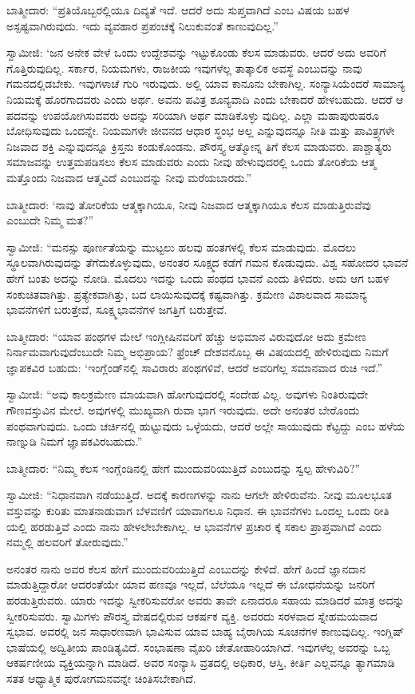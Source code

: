 ಬಾತ್ಮೀದಾರ: “ಪ್ರತಿಯೊಬ್ಬರಲ್ಲಿಯೂ ದಿವ್ಯತೆ ಇದೆ. ಆದರೆ ಅದು ಸುಪ್ತವಾಗಿದೆ ಎಂಬ ವಿಷಯ ಬಹಳ ಅಸ್ಪಷ್ಟವಾಗಿರುವುದು. ಇದು ವ್ಯವಹಾರ ಪ್ರಪಂಚಕ್ಕೆ ನಿಲುಕುವಂತೆ ಕಾಣುವುದಿಲ್ಲ.”

ಸ್ವಾಮೀಜಿ: ‘ಜನ ಅನೇಕ ವೇಳೆ ಒಂದು ಉದ್ದೇಶವನ್ನು ಇಟ್ಟುಕೊಂಡು ಕೆಲಸ ಮಾಡುವರು. ಆದರೆ ಅದು ಅವರಿಗೆ ಗೊತ್ತಿರುವುದಿಲ್ಲ. ಸರ್ಕಾರ, ನಿಯಮಗಳು, ರಾಜಕೀಯ ಇವುಗಳೆಲ್ಲ ತಾತ್ಕಾಲಿಕ ಅವಸ್ಥೆ ಎಂಬುದನ್ನು ನಾವು ಗಮನದಲ್ಲಿಡಬೇಕು. ಇವುಗಳಾಚೆ ಗುರಿ ಇರುವುದು. ಅಲ್ಲಿ ಯಾವ ಕಾನೂನು ಬೇಕಾಗಿಲ್ಲ. ಸಂನ್ಯಾಸಿಯೆಂದರೆ ಸಾಮಾನ್ಯ ನಿಯಮಕ್ಕೆ ಹೊರಗಾದವರು ಎಂದು ಅರ್ಥ. ಅವನು ಪವಿತ್ರ ಶೂನ್ಯವಾದಿ ಎಂದು ಬೇಕಾದರೆ ಹೇಳಬಹುದು. ಆದರೆ ಆ ಪದವನ್ನು ಉಪಯೋಗಿಸುವವರು ಅದನ್ನು ಸರಿಯಾಗಿ ಅರ್ಥ ಮಾಡಿಕೊಳ್ಳು ವುದಿಲ್ಲ. ಎಲ್ಲಾ ಮಹಾಪುರುಷರೂ ಬೋಧಿಸುವುದು ಒಂದನ್ನೇ. ನಿಯಮಗಳೇ ಜೀವನದ ಆಧಾರ ಸ್ಥಂಭ ಅಲ್ಲ ಎನ್ನುವುದನ್ನೂ ನೀತಿ ಮತ್ತು ಪಾವಿತ್ರ್ಯಗಳೇ ನಿಜವಾದ ಶಕ್ತಿ ಎನ್ನುವುದನ್ನೂ ಕ್ರಿಸ್ತನು ಕಂಡುಕೊಂಡನು. ಪೌರಸ್ತ್ಯ ಆತ್ಮೋನ್ನ ತಿಗೆ ಕೆಲಸ ಮಾಡುವರು. ಪಾಶ್ಚಾತ್ಯರು ಸಮಾಜವನ್ನು ಉತ್ತಮಪಡಿಸಲು ಕೆಲಸ ಮಾಡುವರು ಎಂದು ನೀವು ಹೇಳುವುದರಲ್ಲಿ ಒಂದು ತೋರಿಕೆಯ ಆತ್ಮ ಮತ್ತೊಂದು ನಿಜವಾದ ಆತ್ಮವಿದೆ ಎಂಬುದನ್ನು ನೀವು ಮರೆಯಬಾರದು.”

ಬಾತ್ಮೀದಾರ: ‘ನಾವು ತೋರಿಕೆಯ ಆತ್ಮಕ್ಕಾಗಿಯೂ, ನೀವು ನಿಜವಾದ ಆತ್ಮಕ್ಕಾಗಿಯೂ ಕೆಲಸ ಮಾಡುತ್ತಿರುವೆವು ಎಂಬುದೇ ನಿಮ್ಮ ಮತ?”

ಸ್ವಾಮೀಜಿ: “ಮನಸ್ಸು ಪೂರ್ಣತೆಯನ್ನು ಮುಟ್ಟಲು ಹಲವು ಹಂತಗಳಲ್ಲಿ ಕೆಲಸ ಮಾಡುವುದು. ಮೊದಲು ಸ್ಥೂಲವಾಗಿರುವುದನ್ನು ತೆಗೆದುಕೊಳ್ಳುವುದು, ಅನಂತರ ಸೂಕ್ಷ್ಮದ ಕಡೆಗೆ ಗಮನ ಕೊಡುವುದು. ವಿಶ್ವ ಸಹೋದರ ಭಾವನೆ ಹೇಗೆ ಬಂತು ಅದನ್ನು ನೋಡಿ. ಮೊದಲು ಇದನ್ನು ಒಂದು ಪಂಥದ ಭಾವನೆ ಎಂದು ತಿಳಿದರು. ಅದು ಆಗ ಬಹಳ ಸಂಕುಚಿತವಾಗಿತ್ತು. ಪ್ರತ್ಯೇಕವಾಗಿತ್ತು, ಬದ ಲಾಯಿಸುವುದಕ್ಕೆ ಕಷ್ಟವಾಗಿತ್ತು. ಕ್ರಮೇಣ ವಿಶಾಲವಾದ ಸಾಮಾನ್ಯ ಭಾವನೆಗಳಿಗೆ ಬರುತ್ತೇವೆ, ಸೂಕ್ಷ್ಮಭಾವನೆಗಳ ಜಗತ್ತಿಗೆ ಬರುತ್ತೇವೆ.

ಬಾತ್ಮೀದಾರ: “ಯಾವ ಪಂಥಗಳ ಮೇಲೆ ಇಂಗ್ಲೀಷಿನವರಿಗೆ ಹೆಚ್ಚು ಅಭಿಮಾನ ವಿರುವುದೋ ಅದು ಕ್ರಮೇಣ ನಿರ್ನಾಮವಾಗುವುದೆಂಬುದೇ ನಿಮ್ಮ ಅಭಿಪ್ರಾಯ? ಫ್ರೆಂಚ್​ ದೇಶವನೊಬ್ಬ ಈ ವಿಷಯದಲ್ಲಿ ಹೇಳಿರುವುದು ನಿಮಗೆ ಜ್ಞಾಪಕವಿರ ಬಹುದು: ‘ಇಂಗ್ಲೆಂಡ್​ನಲ್ಲಿ ಸಾವಿರಾರು ಪಂಥಗಳಿವೆ, ಆದರೆ ಅವರಿಗೆಲ್ಲ ಸಮಾನವಾದ ರುಚಿ ಇದೆ.”

ಸ್ವಾಮೀಜಿ: “ಅವು ಕಾಲಕ್ರಮೇಣ ಮಾಯವಾಗಿ ಹೋಗುವುದರಲ್ಲಿ ಸಂದೇಹ ವಿಲ್ಲ. ಅವುಗಳು ನಿಂತಿರುವುದೇ ಗೌಣವಸ್ತುವಿನ ಮೇಲೆ. ಅವುಗಳಲ್ಲಿ ಮುಖ್ಯವಾಗಿ ರುವಾ ಭಾಗ ಇರುವುದು. ಅದೇ ಅನಂತರ ಬೇರೊಂದು ಪಂಥವಾಗುವುದು. ಒಂದು ಚರ್ಚಿನಲ್ಲಿ ಹುಟ್ಟುವುದು ಒಳ್ಳೆಯದು, ಆದರೆ ಅಲ್ಲೇ ಸಾಯುವುದು ಕೆಟ್ಟದ್ದು ಎಂಬ ಹಳೆಯ ನಾಣ್ನುಡಿ ನಿಮಗೆ ಜ್ಞಾಪಕವಿರಬಹುದು.”

ಬಾತ್ಮೀದಾರ: “ನಿಮ್ಮ ಕೆಲಸ ಇಂಗ್ಲೆಂಡಿನಲ್ಲಿ ಹೇಗೆ ಮುಂದುವರಿಯುತ್ತಿದೆ ಎಂಬುದನ್ನು ಸ್ವಲ್ಪ ಹೇಳುವಿರಿ?”

ಸ್ವಾಮೀಜಿ: “ನಿಧಾನವಾಗಿ ನಡೆಯುತ್ತಿದೆ. ಅದಕ್ಕೆ ಕಾರಣಗಳನ್ನು ನಾನು ಆಗಲೇ ಹೇಳಿರುವೆನು. ನೀವು ಮೂಲಭೂತ ವಸ್ತುವನ್ನು ಕುರಿತು ಮಾತನಾಡುವಾಗ ಬೆಳವಣಿಗೆ ಯಾವಾಗಲೂ ನಿಧಾನ. ಈ ಭಾವನೆಗಳು ಒಂದಲ್ಲ ಒಂದು ರೀತಿ ಯಲ್ಲಿ ಹರಡುತ್ತಿವೆ ಎಂದು ನಾನು ಹೇಳಲೇಬೇಕಾಗಿಲ್ಲ. ಆ ಭಾವನೆಗಳ ಪ್ರಚಾರ ಕ್ಕೆ ಸಕಾಲ ಪ್ರಾಪ್ತವಾಗಿದೆ ಎಂದು ನಮ್ಮಲ್ಲಿ ಹಲವರಿಗೆ ತೋರುವುದು.”

ಅನಂತರ ನಾನು ಅವರ ಕೆಲಸ ಹೇಗೆ ಮುಂದುವರಿಯುತ್ತಿದೆ ಎಂಬುದನ್ನು ಕೇಳಿದೆ. ಹೇಗೆ ಹಿಂದೆ ಜ್ಞಾನದಾನ ಮಾಡುತ್ತಿದ್ದಾರೋ ಆದರಂತೆಯೇ ಯಾವ ಹಣವೂ ಇಲ್ಲದೆ, ಬೆಲೆಯೂ ಇಲ್ಲದೆ ಈ ಬೋಧನೆಯನ್ನು ಜನರಿಗೆ ಹರಡುತ್ತಿರುವರು. ಯಾರು ಇದನ್ನು ಸ್ವೀಕರಿಸುವರೋ ಅವರು ತಾವೇ ಏನಾದರೂ ಸಹಾಯ ಮಾಡಿದರೆ ಮಾತ್ರ ಅದನ್ನು ಸ್ವೀಕರಿಸುವರು. ಸ್ವಾಮಿಗಳು ಪೌರಸ್ತ್ಯ ವೇಷದಲ್ಲಿರುವ ಆಕರ್ಷಕ ವ್ಯಕ್ತಿ. ಅವರದು ಸರಳವಾದ ಸ್ನೇಹಮಯವಾದ ಸ್ವಭಾವ. ಅವರಲ್ಲಿ ಜನ ಸಾಧಾರಣವಾಗಿ ಭಾವಿಸುವ ಯಾವ ಬಾಹ್ಯ ಬೈರಾಗಿಯ ಸೂಚನೆಗಳ ಕಾಣುವುದಿಲ್ಲ. ಇಂಗ್ಲಿಷ್​ ಭಾಷೆಯಲ್ಲಿ ಅದ್ವಿತೀಯ ಪಾಂಡಿತ್ಯವಿದೆ. ಸಂಭಾಷಣಾ ವೈಖರಿ ಚೇತೋಹಾರಿಯಾಗಿದೆ. ಇವುಗಳೆಲ್ಲ ಅವರನ್ನು ಒಬ್ಬ ಆಕರ್ಷಣೀಯ ವ್ಯಕ್ತಿಯನ್ನಾಗಿ ಮಾಡಿದೆ. ಅವರ ಸಂನ್ಯಾಸಿ ವ್ರತದಲ್ಲಿ ಅಧಿಕಾರ, ಆಸ್ತಿ, ಕೀರ್ತಿ ಎಲ್ಲವನ್ನೂ ತ್ಯಾಗಮಾಡಿ ಸತತ ಆಧ್ಯಾತ್ಮಿಕ ಪುರೋಗಮನವನ್ನೇ ಚಿಂತಿಸಬೇಕಾಗಿದೆ.

